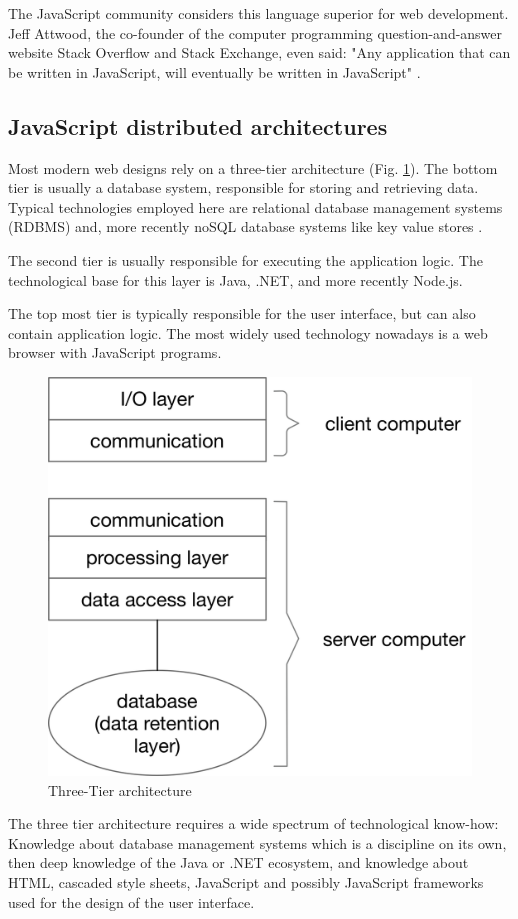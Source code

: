 The JavaScript community considers this language superior for web development. Jeff Attwood, the co-founder of 
the  computer programming question-and-answer website Stack Overflow and Stack Exchange, even said: 
"Any application that can be written in JavaScript, will eventually be written in JavaScript" \cite{Louis2018Java}.
 
\subsection{JavaScript distributed architectures}

Most modern web designs rely on a three-tier architecture (Fig. 
\ref{fig:TT}). The bottom tier is usually a database system, responsible for storing and retrieving data. Typical 
technologies employed here are relational database management systems (RDBMS) and, more recently noSQL database systems like key value stores \cite{GOLL}.  

The second tier is usually responsible for executing the application logic.
The technological base for this layer is Java, .NET, and more recently Node.js.
 
The top most tier is typically responsible for the user interface, but can also contain application logic.
The most widely used technology nowadays is a web browser with JavaScript programs. 

\begin{figure}[H]
	\centering
	\includegraphics[width=0.5\linewidth]{bilder/grundlagen/Three-Tier.png}
	\caption{Three-Tier architecture \cite{GOLL}}
	\label{fig:TT}
\end{figure}

The three tier architecture requires a wide spectrum of technological know-how:
Know\-ledge about database management systems which is a discipline on its own,
then deep knowledge of the Java or  .NET ecosystem, and knowledge about HTML, 
cascaded style sheets, JavaScript 
and possibly JavaScript frameworks used for the design of the user interface.

